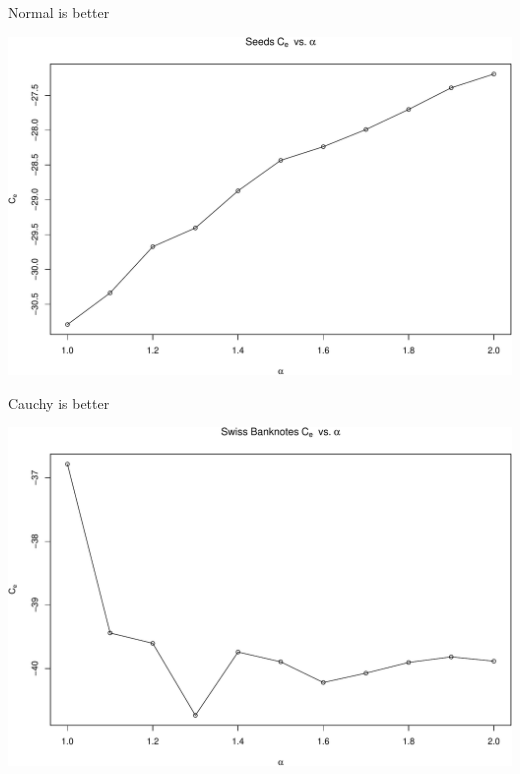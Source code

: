 \documentclass[ignorenonframetext,]{beamer}
\begin{document}
\begin{frame}{Normal is better}

\begin{center}\includegraphics[width=1\linewidth]{Presentation_files/figure-beamer/unnamed-chunk-23-1} \end{center}

\end{frame}

\begin{frame}{Cauchy is better}

\begin{center}\includegraphics[width=1\linewidth]{Presentation_files/figure-beamer/unnamed-chunk-24-1} \end{center}

\end{frame}
\end{document}
